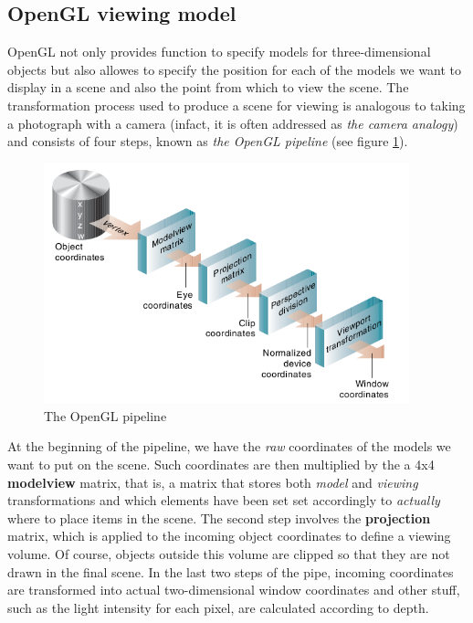 %
%
\subsection{OpenGL viewing model}
OpenGL not only provides function to specify models for 
three-dimensional objects but also allowes to specify the 
position for each of the models we want to display in a 
scene and also the point from which to view the scene.
%
The transformation process used to produce a scene for viewing 
is analogous to taking a photograph with a camera (infact, it 
is often addressed as \textit{the camera analogy}\cite{opengl:cameraanalogy}) 
and consists of four steps, known as 
\textit{the OpenGL pipeline} (see figure \ref{fig:openglpipe}).
%
\begin{figure}[!h]
  \begin{center}
    \includegraphics[width=300pt]{img/openGLpipe.png}
    \caption{The OpenGL pipeline}
    \label{fig:openglpipe}
  \end{center}
\end{figure}
%
At the beginning of the pipeline, we have the \textit{raw} 
coordinates of the models we want to put on the scene. Such 
coordinates are then multiplied by the a 4x4 \textbf{modelview} 
matrix, that is, a matrix that stores both \textit{model} and 
\textit{viewing} transformations and which elements have been set 
set accordingly to \textit{actually} where to place items in the scene.
%
The second step involves the \textbf{projection} matrix, 
which is applied to the incoming object coordinates to define a 
viewing volume. Of course, objects outside this volume are clipped 
so that they are not drawn in the final scene. 
%
In the last two steps of the pipe, incoming coordinates are transformed 
into actual two-dimensional window coordinates and other stuff, such as 
the light intensity for each pixel, are calculated according to depth.
%
